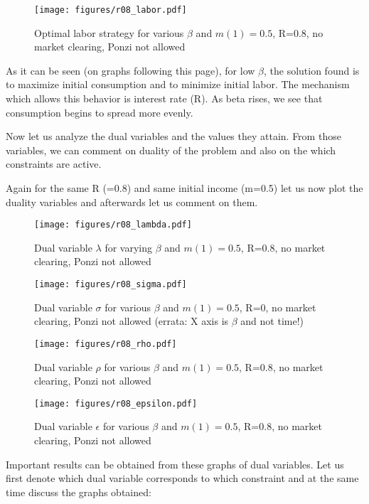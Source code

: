 \begin{figure}
\caption{Optimal labor strategy for various $\beta$ and $m(1)=0.5$, R=0.8, no market clearing, Ponzi not allowed}\centering
\texttt{[image: figures/r08\_labor.pdf]}
\end{figure}


As it can be seen (on graphs following this page), for low $\beta$, the solution found is to maximize initial consumption and to minimize initial labor. The mechanism which allows this behavior is interest rate (R). As beta rises, we see that consumption begins to spread more evenly. 

Now let us analyze the dual variables and the values they attain. From those variables, we can comment on duality of the problem and also on the which constraints are active.

Again for the same R (=0.8) and same initial income (m=0.5) let us now plot the duality variables and afterwards let us comment on them.

\begin{figure}
\caption{Dual variable $\lambda$ for varying $\beta$ and $m(1)=0.5$, R=0.8, no market clearing, Ponzi not allowed}
\centering
\texttt{[image: figures/r08\_lambda.pdf]}
\end{figure}


\begin{figure}
\caption{Dual variable $\sigma$ for various $\beta$ and $m(1)=0.5$, R=0, no market clearing, Ponzi not allowed (errata: X axis is $\beta$ and not time!)}
\centering
\texttt{[image: figures/r08\_sigma.pdf]}
\end{figure}


\begin{figure}
\caption{Dual variable $\rho$ for various $\beta$ and $m(1)=0.5$, R=0.8, no market clearing, Ponzi not allowed}
\centering
\texttt{[image: figures/r08\_rho.pdf]}
\end{figure}


\begin{figure}
\caption{Dual variable $\epsilon$ for various $\beta$ and $m(1)=0.5$, R=0.8, no market clearing, Ponzi not allowed}\centering
\texttt{[image: figures/r08\_epsilon.pdf]}
\end{figure}

Important results can be obtained from these graphs of dual variables. Let us first denote which dual variable corresponds to which constraint and at the same time discuss the graphs obtained:

